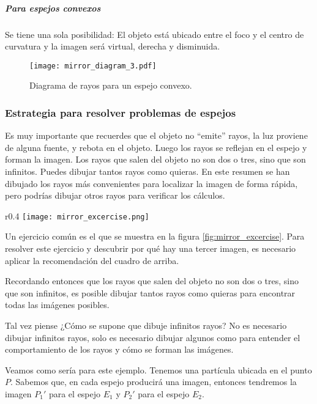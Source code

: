\subparagraph{Para espejos convexos}

Se tiene una sola posibilidad: El objeto está ubicado entre el foco y el centro de curvatura y la imagen será virtual, derecha y disminuida.

\begin{figure}[ht]
  \centering
  \texttt{[image: mirror\_diagram\_3.pdf]}
  \caption{Diagrama de rayos para un espejo convexo.}
  \label{fig:mirror_diagram_3}
\end{figure}

\subsubsection{Estrategia para resolver problemas de espejos}

\begin{tcolorbox}[interesting_data, title=Recuerda]
  Es muy importante que recuerdes que el objeto no ``emite'' rayos, la luz proviene de alguna fuente, y rebota en el objeto. Luego los rayos se reflejan en el espejo y forman la imagen.
  Los rayos que salen del objeto no son dos o tres, sino que son infinitos. Puedes dibujar tantos rayos como quieras. En este resumen se han dibujado los rayos más convenientes para localizar la imagen de forma rápida, pero podrías dibujar otros rayos para verificar los cálculos.
\end{tcolorbox}

\begin{wrapfigure}{r}{0.4\textwidth}
  \centering
  \texttt{[image: mirror\_excercise.png]}
  \caption{Dos espejos ubicados a 90 grados entre sí.}
  \label{fig:mirror_excercise}
\end{wrapfigure}
Un ejercicio común es el que se muestra en la figura \ref{fig:mirror_excercise}. Para resolver este ejercicio y descubrir por qué hay una tercer imagen, es necesario aplicar la recomendación del cuadro de arriba. 

Recordando entonces que los rayos que salen del objeto no son dos o tres, sino que son infinitos, es posible dibujar tantos rayos como quieras para encontrar todas las imágenes posibles.

Tal vez piense ¿Cómo se supone que dibuje infinitos rayos? No es necesario dibujar infinitos rayos, solo es necesario dibujar algunos como para entender el comportamiento de los rayos y cómo se forman las imágenes.

Veamos como sería para este ejemplo. Tenemos una partícula ubicada en el punto \(P\). Sabemos que, en cada espejo producirá una imagen, entonces tendremos la imagen \(P_1'\) para el espejo \(E_1\) y \(P_2'\) para el espejo \(E_2\).

